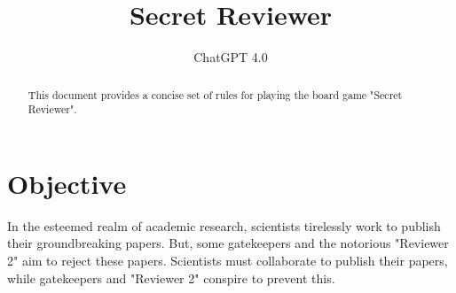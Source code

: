 \documentclass[sigplan,screen,nonacm]{acmart}
\begin{document}
\title{Secret Reviewer}

\author{ChatGPT 4.0}

\begin{abstract}
	This document provides a concise set of rules for playing the board game "Secret Reviewer".
\end{abstract}





\maketitle

\section*{Objective}

In the esteemed realm of academic research, scientists tirelessly work to publish their groundbreaking papers. But, some gatekeepers and the notorious "Reviewer 2" aim to reject these papers. Scientists must collaborate to publish their papers, while gatekeepers and "Reviewer 2" conspire to prevent this.
\end{document}

